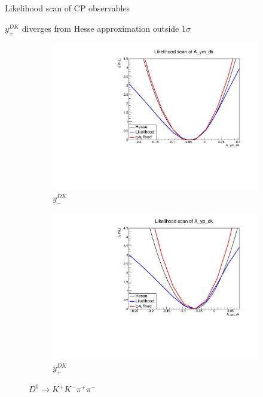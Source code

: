 \documentclass[xcolor={dvipsnames}]{beamer}
\begin{document}
\begin{frame}{Likelihood scan of CP observables}
  \begin{center}
    $y_\pm^{DK}$ diverges from Hesse approximation outside $1\sigma$
  \end{center}
  \begin{figure}
    \centering
    \begin{subfigure}{0.5\textwidth}
      \centering
      \includegraphics[width=1.0\textwidth]{Plots/A_ym_dk_likelihood_scan_KKpipi.pdf}
      \vspace{-0.3cm}
      \caption*{$y_-^{DK}$}
    \end{subfigure}%
    \begin{subfigure}{0.5\textwidth}
      \centering
      \includegraphics[width=1.0\textwidth]{Plots/A_yp_dk_likelihood_scan_KKpipi.pdf}
      \vspace{-0.3cm}
      \caption*{$y_+^{DK}$}
    \end{subfigure}
    \caption*{$D^0\to K^+K^-\pi^+\pi^-$}
  \end{figure}
\end{frame}
\end{document}
